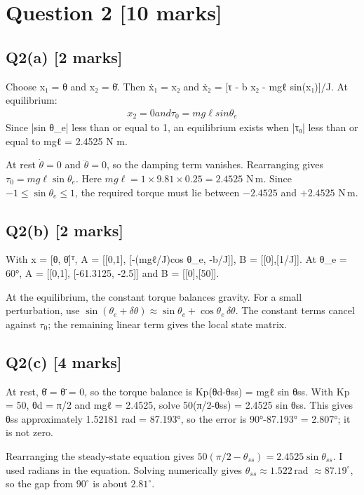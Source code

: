\documentclass[11pt,a4paper]{article}
\begin{document}
\section*{Question 2 \hfill [10 marks]}
\subsection*{Q2(a) \hfill [2 marks]}

Choose x₁ = θ and x₂ = θ̇.
Then ẋ₁ = x₂ and ẋ₂ = [τ - b x₂ - mgℓ sin(x₁)]/J.
At equilibrium:\[\begin{aligned}x_2 = 0 and τ_0 = mg\ell sin \theta_e\end{aligned}\]
Since |sin θ\_e| less than or equal to 1, an equilibrium exists when |τ₀| less than or equal to mgℓ = 2.4525 N m.\par\smallskip At rest $\dot\theta=0$ and $\ddot\theta=0$, so the damping term vanishes. Rearranging gives $\tau_0=mg\ell\sin\theta_e$. Here $mg\ell=1\times9.81\times0.25=2.4525$ N\,m. Since $-1\leq\sin\theta_e\leq1$, the required torque must lie between $-2.4525$ and $+2.4525$ N\,m.

\subsection*{Q2(b) \hfill [2 marks]}

With x = [θ, θ̇]ᵀ, A = [[0,1], [-(mgℓ/J)cos θ\_e, -b/J]], B = [[0],[1/J]].
At θ\_e = 60°, A = [[0,1], [-61.3125, -2.5]] and B = [[0],[50]].\par\smallskip At the equilibrium, the constant torque balances gravity. For a small perturbation, use $\sin(\theta_e+\delta\theta)\approx\sin\theta_e+\cos\theta_e\,\delta\theta$. The constant terms cancel against $\tau_0$; the remaining linear term gives the local state matrix.

\subsection*{Q2(c) \hfill [4 marks]}

At rest, θ̇ = θ̈ = 0, so the torque balance is Kp(θd-θss) = mgℓ sin θss.
With Kp = 50, θd = π/2 and mgℓ = 2.4525, solve 50(π/2-θss) = 2.4525 sin θss.
This gives θss approximately 1.52181 rad = 87.193°, so the error is 90°-87.193° = 2.807°; it is not zero.\par\smallskip Rearranging the steady-state equation gives $50(\pi/2-\theta_{ss})=2.4525\sin\theta_{ss}$. I used radians in the equation. Solving numerically gives $\theta_{ss}\approx1.522\,$rad $\approx87.19^\circ$, so the gap from $90^\circ$ is about $2.81^\circ$.
\end{document}
